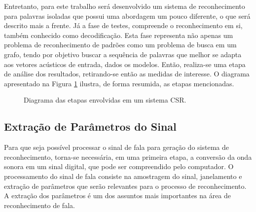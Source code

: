 \documentclass[12pt,a4paper,oneside]{report}
\begin{document}
Entretanto, para este trabalho será desenvolvido um sistema de reconhecimento para palavras isoladas que possui uma abordagem um pouco diferente, o que será descrito mais a frente. Já a fase de testes, compreende o reconhecimento em si, também conhecido como decodificação. Esta fase representa não apenas um problema de reconhecimento de padrões como um problema de busca em um grafo, tendo por objetivo buscar a sequência de palavras que melhor se adapta aos vetores acústicos de entrada, dados os modelos. Então, realiza-se uma etapa de análise dos resultados, retirando-se então as medidas de interesse. O diagrama apresentado na Figura \ref{fig:CSR} ilustra, de forma resumida, as etapas mencionadas.

\begin{figure}[h!]
\centering
{}\caption{Diagrama das etapas envolvidas em um sistema CSR.}
\label{fig:CSR}
\end{figure}

\subsection{Extração de Parâmetros do Sinal}

Para que seja possível processar o sinal de fala para geração do sistema de reconhecimento, torna-se necessária, em uma primeira etapa, a conversão da onda sonora em um sinal digital, que pode ser compreendido pelo computador. O processamento do sinal de fala consiste na amostragem do sinal, janelamento e extração de parâmetros que serão relevantes para o processo de reconhecimento. A extração dos parâmetros é um dos assuntos mais importantes na área de reconhecimento de fala.
\end{document}
